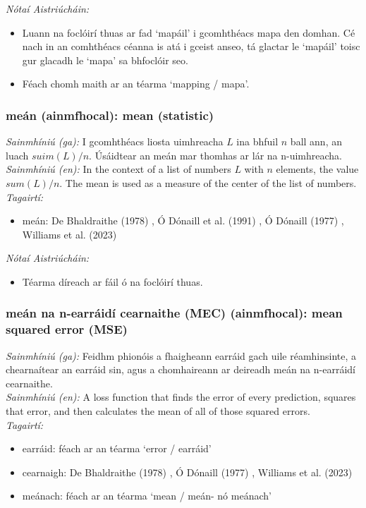  \noindent \textit{Nótaí Aistriúcháin:}
\begin{itemize}
	\item Luann na foclóirí thuas ar fad `mapáil' i gcomhthéacs mapa den domhan. Cé nach in an comhthéacs céanna is atá i gceist anseo, tá glactar le `mapáil' toisc gur glacadh le `mapa' sa bhfoclóir seo.
	\item Féach chomh maith ar an téarma `mapping / mapa'.
\end{itemize}


\subsubsection*{meán (ainmfhocal): mean (statistic)}
 \noindent \textit{Sainmhíniú (ga):} I gcomhthéacs liosta uimhreacha $L$ ina bhfuil $n$ ball ann, an luach $suim(L) / n$. Úsáidtear an meán mar thomhas ar lár na n-uimhreacha.
\\
 \noindent \textit{Sainmhíniú (en):} In the context of a list of numbers $L$ with $n$ elements, the value $sum(L) / n$. The mean is used as a measure of the center of the list of numbers.
\\
 \noindent \textit{Tagairtí:}
\begin{itemize}
	\item meán: De Bhaldraithe (1978) \cite{de-bhaldraithe}, Ó Dónaill et al. (1991) \cite{focloir-beag}, Ó Dónaill (1977) \cite{odonaill}, Williams et al. (2023) \cite{storchiste}
\end{itemize}

 \noindent \textit{Nótaí Aistriúcháin:}
\begin{itemize}
	\item Téarma díreach ar fáil ó na foclóirí thuas.
\end{itemize}


\subsubsection*{meán na n-earráidí cearnaithe (MEC) (ainmfhocal): mean squared error (MSE)}
 \noindent \textit{Sainmhíniú (ga):} Feidhm phionóis a fhaigheann earráid gach uile réamhinsinte, a chearnaítear an earráid sin, agus a chomhaireann ar deireadh meán na n-earráidí cearnaithe.
\\
 \noindent \textit{Sainmhíniú (en):} A loss function that finds the error of every prediction, squares that error, and then calculates the mean of all of those squared errors.
\\
 \noindent \textit{Tagairtí:}
\begin{itemize}
	\item earráid: féach ar an téarma `error / earráid'
	\item cearnaigh: De Bhaldraithe (1978) \cite{de-bhaldraithe}, Ó Dónaill (1977) \cite{odonaill}, Williams et al. (2023) \cite{storchiste}
	\item meánach: féach ar an téarma `mean / meán- nó meánach'
\end{itemize}

